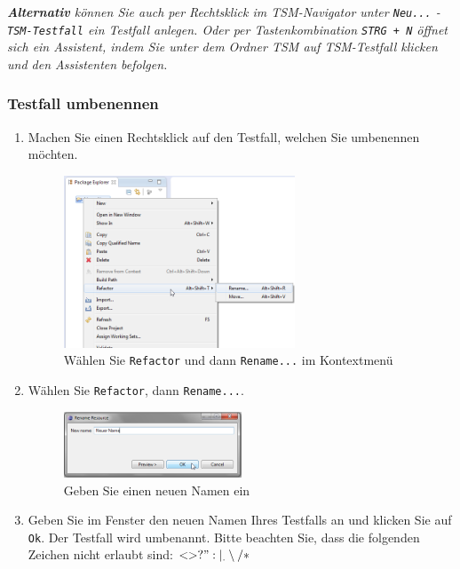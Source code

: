 \documentclass[11pt,a4paper,titlepage]{article}
\begin{document}
\textit{\textbf{Alternativ} können Sie auch per Rechtsklick im TSM-Navigator unter \texttt{Neu...} - \texttt{TSM-Testfall} ein Testfall anlegen. Oder per  Tastenkombination \texttt{STRG + N} öffnet sich ein Assistent, indem Sie unter dem Ordner TSM auf TSM-Testfall klicken und den Assistenten befolgen.}

\subsubsection{Testfall umbenennen}
\begin{enumerate}
\item Machen Sie einen Rechtsklick auf den Testfall, welchen Sie umbenennen möchten.

\begin{figure}[H]
\centering
\includegraphics[width= 260px]{BilderHandbuch/UmbenennenR.png}
\caption{Wählen Sie \texttt{Refactor} und dann \texttt{Rename...} im Kontextmenü}
\label{fig:UmbenennenR}
\end{figure}

\item Wählen Sie \texttt{Refactor}, dann \texttt{Rename...}.

\begin{figure}[H]
\centering
\includegraphics[width= 200px]{BilderHandbuch/UmbenennenFenster.png}
\caption{Geben Sie einen neuen Namen ein}
\label{fig:UmbenennenFenster}
\end{figure}

\item Geben Sie im Fenster den neuen Namen Ihres Testfalls an und klicken Sie auf \texttt{Ok}. Der Testfall wird umbenannt. Bitte beachten Sie, dass die folgenden Zeichen nicht erlaubt sind: $ < > ? " : | _ . \setminus / *$
\end{enumerate}
\end{document}
